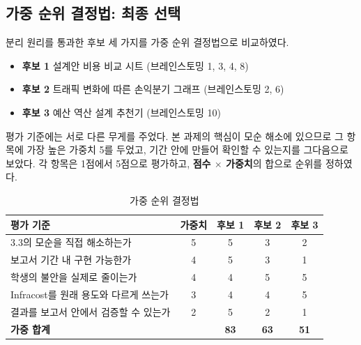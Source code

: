 \documentclass[10pt,a4paper]{article}
\begin{document}
\subsection{가중 순위 결정법: 최종 선택}

분리 원리를 통과한 후보 세 가지를 가중 순위 결정법으로 비교하였다.

\begin{itemize}[itemsep=1pt, topsep=4pt]
\item \textbf{후보 1} 설계안 비용 비교 시트 (브레인스토밍 1, 3, 4, 8)
\item \textbf{후보 2} 트래픽 변화에 따른 손익분기 그래프 (브레인스토밍 2, 6)
\item \textbf{후보 3} 예산 역산 설계 추천기 (브레인스토밍 10)
\end{itemize}

평가 기준에는 서로 다른 무게를 주었다. 본 과제의 핵심이 모순 해소에 있으므로 그 항목에 가장 높은 가중치 5를 두었고, 기간 안에 만들어 확인할 수 있는지를 그다음으로 보았다. 각 항목은 1점에서 5점으로 평가하고, \textbf{점수 $\times$ 가중치}의 합으로 순위를 정하였다.

\begin{table}[!h]
\centering
\caption{가중 순위 결정법}
\label{tab:weighted}
\footnotesize
\begin{tabularx}{\textwidth}{Y c c c c}
\toprule
\textbf{평가 기준} & \textbf{가중치} & \textbf{후보 1} & \textbf{후보 2} & \textbf{후보 3} \\
\midrule
3.3의 모순을 직접 해소하는가        & 5 & 5 & 3 & 2 \\
보고서 기간 내 구현 가능한가        & 4 & 5 & 3 & 1 \\
학생의 불안을 실제로 줄이는가       & 4 & 4 & 5 & 5 \\
Infracost를 원래 용도와 다르게 쓰는가 & 3 & 4 & 4 & 5 \\
결과를 보고서 안에서 검증할 수 있는가 & 2 & 5 & 2 & 1 \\
\midrule
\textbf{가중 합계} & & \textbf{83} & \textbf{63} & \textbf{51} \\
\bottomrule
\end{tabularx}
\end{table}
\end{document}
